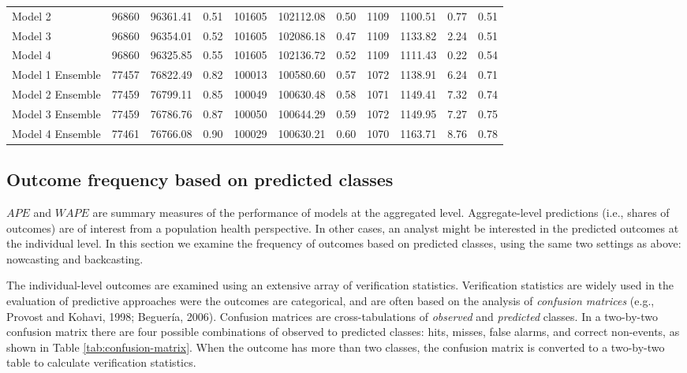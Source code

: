 \documentclass[]{elsarticle} %
\begin{document}
\begin{table}
\begin{tabular}[t]{lrrrrrrrrrr}
\rowcolor{gray!15}
\hspace{1em}Model 2 & 96860 & 96361.41 & 0.51 & 101605 & 102112.08 & 0.50 & 1109 & 1100.51 & 0.77 & 0.51\\
\hspace{1em}Model 3 & 96860 & 96354.01 & 0.52 & 101605 & 102086.18 & 0.47 & 1109 & 1133.82 & 2.24 & 0.51\\
\rowcolor{gray!15}
\hspace{1em}Model 4 & 96860 & 96325.85 & 0.55 & 101605 & 102136.72 & 0.52 & 1109 & 1111.43 & 0.22 & 0.54\\
\hspace{1em}Model 1 Ensemble & 77457 & 76822.49 & 0.82 & 100013 & 100580.60 & 0.57 & 1072 & 1138.91 & 6.24 & 0.71\\
\rowcolor{gray!15}
\hspace{1em}Model 2 Ensemble & 77459 & 76799.11 & 0.85 & 100049 & 100630.48 & 0.58 & 1071 & 1149.41 & 7.32 & 0.74\\
\hspace{1em}Model 3 Ensemble & 77459 & 76786.76 & 0.87 & 100050 & 100644.29 & 0.59 & 1072 & 1149.95 & 7.27 & 0.75\\
\rowcolor{gray!15}
Model 4 Ensemble & 77461 & 76766.08 & 0.90 & 100029 & 100630.21 & 0.60 & 1070 & 1163.71 & 8.76 & 0.78\\
\bottomrule
\end{tabular}
\end{table}

\hypertarget{sec:outcomes-classes}{%
\subsection{Outcome frequency based on predicted
classes}\label{sec:outcomes-classes}}

\(APE\) and \(WAPE\) are summary measures of the performance of models
at the aggregated level. Aggregate-level predictions (i.e., shares of
outcomes) are of interest from a population health perspective. In other
cases, an analyst might be interested in the predicted outcomes at the
individual level. In this section we examine the frequency of outcomes
based on predicted classes, using the same two settings as above:
nowcasting and backcasting.

The individual-level outcomes are examined using an extensive array of
verification statistics. Verification statistics are widely used in the
evaluation of predictive approaches were the outcomes are categorical,
and are often based on the analysis of \emph{confusion matrices} (e.g.,
Provost and Kohavi, 1998; Beguería, 2006). Confusion matrices are
cross-tabulations of \emph{observed} and \emph{predicted} classes. In a
two-by-two confusion matrix there are four possible combinations of
observed to predicted classes: hits, misses, false alarms, and correct
non-events, as shown in Table \ref{tab:confusion-matrix}. When the
outcome has more than two classes, the confusion matrix is converted to
a two-by-two table to calculate verification statistics.
\end{document}
